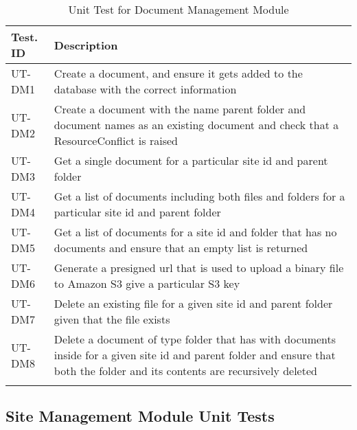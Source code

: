 \documentclass[12pt, titlepage]{article}
\begin{document}
\begin{longtable}{|m{2cm}|m{10cm}|}
  \hline
  \textbf{Test. ID} & \textbf{Description}\\ \hline
  UT-DM1 & Create a document, and ensure it gets added to the
  database with the correct information\\ \hline
  UT-DM2 & Create a document with the name parent folder and document names as
  an existing document and check that a ResourceConflict is raised\\ \hline
  UT-DM3 & Get a single document for a particular site id and parent
  folder\\ \hline
  UT-DM4 & Get a list of documents including both files and folders for a
  particular site id and parent folder\\ \hline
  UT-DM5 & Get a list of documents for a site id and folder that has no
  documents and ensure that an empty list is returned\\ \hline
  UT-DM6 & Generate a presigned url that is used to upload a binary file to
  Amazon S3 give a particular S3 key\\ \hline
  UT-DM7 & Delete an existing file for a given site id and parent folder given
  that the file exists\\ \hline
  UT-DM8 & Delete a document of type folder that has with documents
  inside for a given site id and parent folder and ensure that both
  the folder and its contents are recursively deleted\\ \hline
  \caption{Unit Test for Document Management Module}
\end{longtable}

\subsection{Site Management Module Unit Tests}
\end{document}
